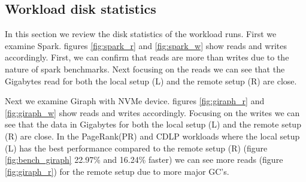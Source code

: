 \subsection{Workload disk statistics}
 In this section we review the disk statistics of the workload runs. First we
 examine Spark. figures \ref{fig:spark_r} and \ref{fig:spark_w} show reads and
 writes accordingly. First, we can confirm that reads are more than writes due to
 the nature of spark benchmarks. Next focusing on the reads we can see that the
 Gigabytes read for both the local setup (L) and the remote setup (R) are close.
 
 Next we examine Giraph with NVMe device. figures \ref{fig:giraph_r} and \ref{fig:giraph_w} show
 reads and writes accordingly. Focusing on the writes we can see that the data
 in Gigabytes for both the local setup (L) and the remote setup (R) are close.
 In the PageRank(PR)	and CDLP workloads where the local setup (L) has the
 best performance compared to the remote setup (R) (figure
 \ref{fig:bench_giraph} 22.97\% and 16.24\% faster) we can see more reads
 (figure \ref{fig:giraph_r}) for the remote setup due to more major GC's.

